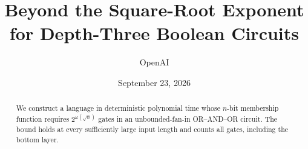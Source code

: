 \documentclass[11pt]{article}
\title{Beyond the Square-Root Exponent\\for Depth-Three Boolean Circuits}
\author{OpenAI}
\date{September 23, 2026}
\begin{document}
\maketitle
\begin{abstract}
We construct a language in deterministic polynomial time whose \(n\)-bit
membership function requires \(2^{\omega(\sqrt n)}\) gates in an
unbounded-fan-in OR--AND--OR circuit.  The bound holds at every
sufficiently large input length and counts all gates, including the
bottom layer.
\end{abstract}







\appendix


\end{document}
